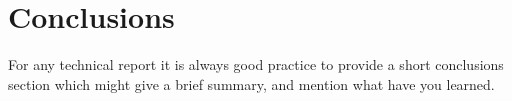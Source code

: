 \section{Conclusions}

For any technical report it is always good practice to provide a short conclusions section which might give a brief summary, and mention what have you learned.